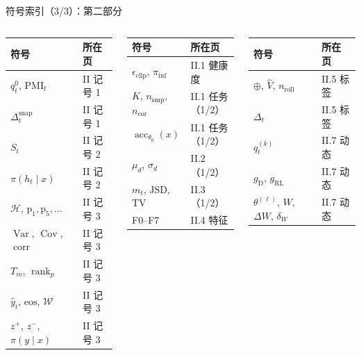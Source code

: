 \documentclass[aspectratio=169,11pt]{beamer}
\newcommand{\acc}{\operatorname{acc}}
\begin{document}
\begin{frame}{符号索引（3/3）：第二部分}
\scriptsize
\setlength{\tabcolsep}{3pt}\renewcommand{\arraystretch}{1.15}
\begin{columns}[T]
\begin{tabular}{@{}ll@{}}
\toprule
\textbf{符号} & \textbf{所在页}\\ \midrule
$q^0_t$, $\mathrm{PMI}_t$ & II 记号 1\\
$\Delta^{\mathrm{snap}}_t$ & II 记号 1\\
$S_t$ & II 记号 2\\
$\pi(h_t\mid x)$ & II 记号 2\\
$\mathcal H$, $\mathrm p_1,\mathrm p_5,\dots$ & II 记号 3\\
$\operatorname{Var}$, $\operatorname{Cov}$, $\operatorname{corr}$ & II 记号 3\\
$T_m$, $\operatorname{rank}_p$ & II 记号 3\\
$\hat y_t$, $\mathrm{eos}$, $\mathcal W$ & II 记号 3\\
$z^+$, $z^-$, $\pi(y\mid x)$ & II 记号 3\\
\bottomrule
\end{tabular}
\begin{tabular}{@{}ll@{}}
\toprule
\textbf{符号} & \textbf{所在页}\\ \midrule
$\epsilon_{\mathrm{clip}}$, $\pi_{\mathrm{inf}}$ & II.1 健康度\\
$K$, $n_{\mathrm{smp}}$, $n_{\mathrm{cor}}$ & II.1 任务（1/2）\\
$\acc_{\theta_0}(x)$ & II.1 任务（1/2）\\
$\mu_d$, $\sigma_d$ & II.2（1/2）\\
$m_t$, $\mathrm{JSD}$, $\mathrm{TV}$ & II.3（1/2）\\
F0--F7 & II.4 特征\\
\bottomrule
\end{tabular}
\begin{tabular}{@{}ll@{}}
\toprule
\textbf{符号} & \textbf{所在页}\\ \midrule
$\oplus$, $\hat V$, $n_{\mathrm{roll}}$ & II.5 标签\\
$\Delta_t$ & II.5 标签\\
$q^{(k)}_t$ & II.7 动态\\
$g_{\mathrm D}$, $g_{\mathrm{RL}}$ & II.7 动态\\
$\theta^{(\ell)}$, $W$, $\Delta W$, $\delta_W$ & II.7 动态\\
\bottomrule
\end{tabular}
\end{columns}
\end{frame}
\end{document}

